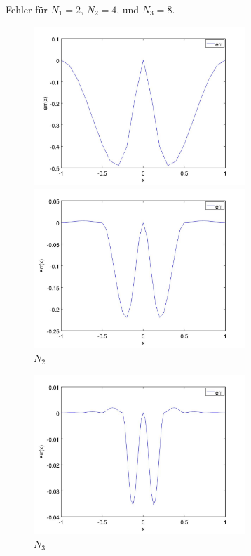 \documentclass[]{scrartcl}
\begin{document}
	Fehler für $N_1=2$, $N_2=4$, und $N_3=8$.
	 \begin{figure}[h]
 		\centering
 		\begin{minipage}{0.5\textwidth}
 			\includegraphics[width=8cm,keepaspectratio]{runge_spline_err_1}
 			\caption{$N_1$\label{Abb.7}}
 		\end{minipage}
 		\begin{minipage}{0.49\textwidth}
 			\includegraphics[width=8cm,keepaspectratio]{runge_spline_err_2}
 			\caption{$N_2$\label{Abb.8}}
 		\end{minipage}
 	\end{figure}
 	
 	\begin{figure}[h]
 		\centering
		\includegraphics[width=8cm,keepaspectratio]{runge_spline_err_3}
		\caption{$N_3$\label{Abb.9}}
 	\end{figure}
 	
\end{document}
